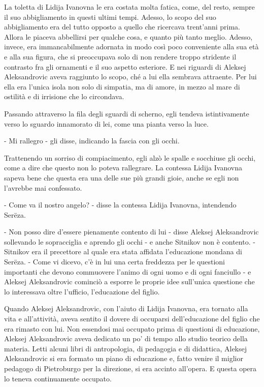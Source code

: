 La toletta di Lidija Ivanovna le era costata molta fatica, come, del resto, sempre il suo abbigliamento in questi ultimi tempi. Adesso, lo scopo del suo abbigliamento era del tutto opposto a quello che ricercava trent'anni prima. Allora le piaceva abbellirsi per qualche cosa, e quanto più tanto meglio. Adesso, invece, era immancabilmente adornata in modo così poco conveniente alla sua età e alla sua figura, che si preoccupava solo di non rendere troppo stridente il contrasto fra gli ornamenti e il suo aspetto esteriore. E nei riguardi di Aleksej Aleksandrovic aveva raggiunto lo scopo, ché a lui ella sembrava attraente. Per lui ella era l'unica isola non solo di simpatia, ma di amore, in mezzo al mare di ostilità e di irrisione che lo circondava. 

Passando attraverso la fila degli sguardi di scherno, egli tendeva istintivamente verso lo sguardo innamorato di lei, come una pianta verso la luce. 

- Mi rallegro - gli disse, indicando la fascia con gli occhi. 

Trattenendo un sorriso di compiacimento, egli alzò le spalle e socchiuse gli occhi, come a dire che questo non lo poteva rallegrare. La contessa Lidija Ivanovna sapeva bene che questa era una delle sue più grandi gioie, anche se egli non l'avrebbe mai confessato. 

- Come va il nostro angelo? - disse la contessa Lidija Ivanovna, intendendo Serëza. 

- Non posso dire d'essere pienamente contento di lui - disse Aleksej Aleksandrovic sollevando le sopracciglia e aprendo gli occhi - e anche Sitnikov non è contento. - Sitnikov era il precettore al quale era stata affidata l'educazione mondana di Serëza. - Come vi dicevo, c'è in lui una certa freddezza per le questioni importanti che devono commuovere l'animo di ogni uomo e di ogni fanciullo - e Aleksej Aleksandrovic cominciò a esporre le proprie idee sull'unica questione che lo interessava oltre l'ufficio, l'educazione del figlio. 

Quando Aleksej Aleksandrovic, con l'aiuto di Lidija Ivanovna, era tornato alla vita e all'attività, aveva sentito il dovere di occuparsi dell'educazione del figlio che era rimasto con lui. Non essendosi mai occupato prima di questioni di educazione, Aleksej Aleksandrovic aveva dedicato un po' di tempo allo studio teorico della materia. Letti alcuni libri di antropologia, di pedagogia e di didattica, Aleksej Aleksandrovic si era formato un piano di educazione e, fatto venire il miglior pedagogo di Pietroburgo per la direzione, si era accinto all'opera. E questa opera lo teneva continuamente occupato. 

